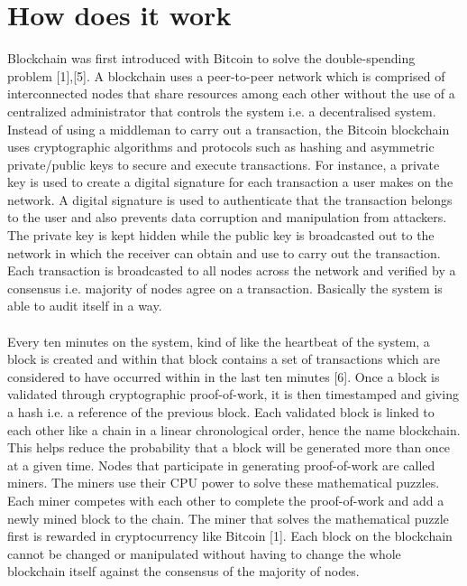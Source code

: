 \documentclass[report]{IEEEtran}
\begin{document}
\section{How does it work}
 Blockchain was first introduced with Bitcoin to solve the double-spending problem [1],[5]. A blockchain uses a peer-to-peer network which is comprised of interconnected nodes that share resources among each other without the use of a centralized administrator that controls the system i.e. a decentralised system. Instead of using a middleman to carry out a transaction, the Bitcoin blockchain uses cryptographic algorithms and protocols such as hashing and asymmetric private/public keys to secure and execute transactions. For instance, a private key is used to create a digital signature for each transaction a user makes on the network. A digital signature is used to authenticate that the transaction belongs to the user and also prevents data corruption and manipulation from attackers. The private key is kept hidden while the public key is broadcasted out to the network in which the receiver can obtain and use to carry out the transaction. Each transaction is broadcasted to all nodes across the network and verified by a consensus i.e. majority of nodes agree on a transaction. Basically the system is able to audit itself in a way.
 \\\\ Every ten minutes on the system, kind of like the heartbeat of the system, a block is created and within that block contains a set of transactions which are considered to have occurred within in the last ten minutes [6]. Once a block is validated through cryptographic proof-of-work, it is then timestamped and giving a hash i.e. a reference of the previous block. Each validated block is linked to each other like a chain in a linear chronological order, hence the name blockchain. This helps reduce the probability that a block will be generated more than once at a given time. Nodes that participate in generating proof-of-work are called miners. The miners use their CPU power to solve these mathematical puzzles. Each miner competes with each other to complete the proof-of-work and add a newly mined block to the chain. The miner that solves the mathematical puzzle first is rewarded in cryptocurrency like Bitcoin [1]. Each block on the blockchain cannot be changed or manipulated without having to change the whole blockchain itself against the consensus of the majority of nodes. 
 
\end{document}

